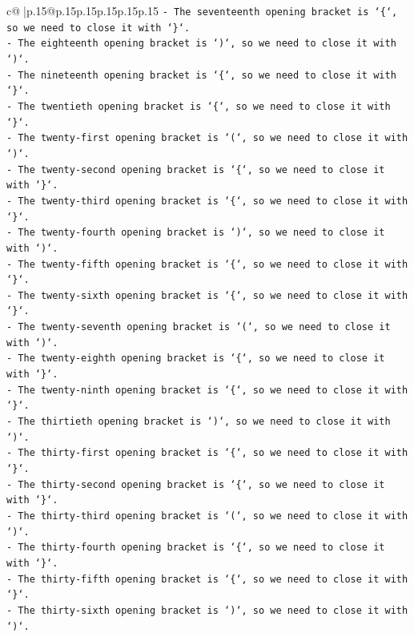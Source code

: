 \documentclass{article}
\begin{document}
{\begin{supertabular}{c@{$\;$}|p{.15\linewidth}@{}p{.15\linewidth}p{.15\linewidth}p{.15\linewidth}p{.15\linewidth}p{.15\linewidth}}
{{{\texttt{{-} The seventeenth opening bracket is `\{`, so we need to close it with `\}`.} \\
\texttt{{-} The eighteenth opening bracket is `)`, so we need to close it with `)`.} \\
\texttt{{-} The nineteenth opening bracket is `\{`, so we need to close it with `\}`.} \\
\texttt{{-} The twentieth opening bracket is `\{`, so we need to close it with `\}`.} \\
\texttt{{-} The twenty{-}first opening bracket is `(`, so we need to close it with `)`.} \\
\texttt{{-} The twenty{-}second opening bracket is `\{`, so we need to close it with `\}`.} \\
\texttt{{-} The twenty{-}third opening bracket is `\{`, so we need to close it with `\}`.} \\
\texttt{{-} The twenty{-}fourth opening bracket is `)`, so we need to close it with `)`.} \\
\texttt{{-} The twenty{-}fifth opening bracket is `\{`, so we need to close it with `\}`.} \\
\texttt{{-} The twenty{-}sixth opening bracket is `\{`, so we need to close it with `\}`.} \\
\texttt{{-} The twenty{-}seventh opening bracket is `(`, so we need to close it with `)`.} \\
\texttt{{-} The twenty{-}eighth opening bracket is `\{`, so we need to close it with `\}`.} \\
\texttt{{-} The twenty{-}ninth opening bracket is `\{`, so we need to close it with `\}`.} \\
\texttt{{-} The thirtieth opening bracket is `)`, so we need to close it with `)`.} \\
\texttt{{-} The thirty{-}first opening bracket is `\{`, so we need to close it with `\}`.} \\
\texttt{{-} The thirty{-}second opening bracket is `\{`, so we need to close it with `\}`.} \\
\texttt{{-} The thirty{-}third opening bracket is `(`, so we need to close it with `)`.} \\
\texttt{{-} The thirty{-}fourth opening bracket is `\{`, so we need to close it with `\}`.} \\
\texttt{{-} The thirty{-}fifth opening bracket is `\{`, so we need to close it with `\}`.} \\
\texttt{{-} The thirty{-}sixth opening bracket is `)`, so we need to close it with `)`.} \\
}}}
\end{supertabular}}
\end{document}
